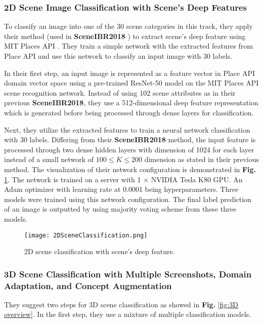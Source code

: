\documentclass[../main.tex]{subfiles}
\begin{document}
	\subsubsection{2D Scene Image Classification with Scene's Deep Features}
	
	To classify an image into one of the 30 scene categories in this track, they apply their method (used in \textbf{SceneIBR2018} \cite{SHREC18-SceneIBR-Track}) to extract scene's deep feature using MIT Places API \cite{zhou2017places}. They train a simple network with the extracted features from Place API and use this network to classify an input image with 30 labels.
	
	In their first step, an input image is represented as a feature vector in Place API domain vector space using a pre-trained ResNet-50 \cite{resnet} model on the MIT Places API scene recognition network. Instead of using 102 scene attributes as in their previous \textbf{SceneIBR2018}, they use a 512-dimensional deep feature representation which is generated before being processed through dense layers for classification.
	
	Next, they utilize the extracted features to train a neural network classification with 30 labels. Differing from their \textbf{SceneIBR2018} method, the input feature is processed through two dense hidden layers with dimension of 1024 for each layer instead of a small network of $100 \le K \le 200$ dimension as stated in their previous method. The visualization of their network configuration is demonstrated in \textbf{Fig.} \ref{fig:2DSceneClassificationNetwork}. The network is trained on a server with 1 $\times$ NVIDIA Tesla K80 GPU. An Adam optimizer with learning rate at 0.0001 being hyperparameters. Three models were trained using this network configuration. The final label prediction of an image is outputted by using majority voting scheme from these three models.
	
	\begin{figure}[h]
		\texttt{[image: 2DSceneClassification.png]}
		\centering
		\caption{2D scene classification with scene's deep feature.}
		\label{fig:2DSceneClassificationNetwork}
	\end{figure}
	
	
	\subsubsection{3D Scene Classification with Multiple Screenshots, Domain Adaptation, and Concept Augmentation}
	They suggest two steps for 3D scene classification as showed in \textbf{Fig.} \ref{fig:3D overview}. In the first step, they use a mixture of multiple classification models.
	
\end{document}
